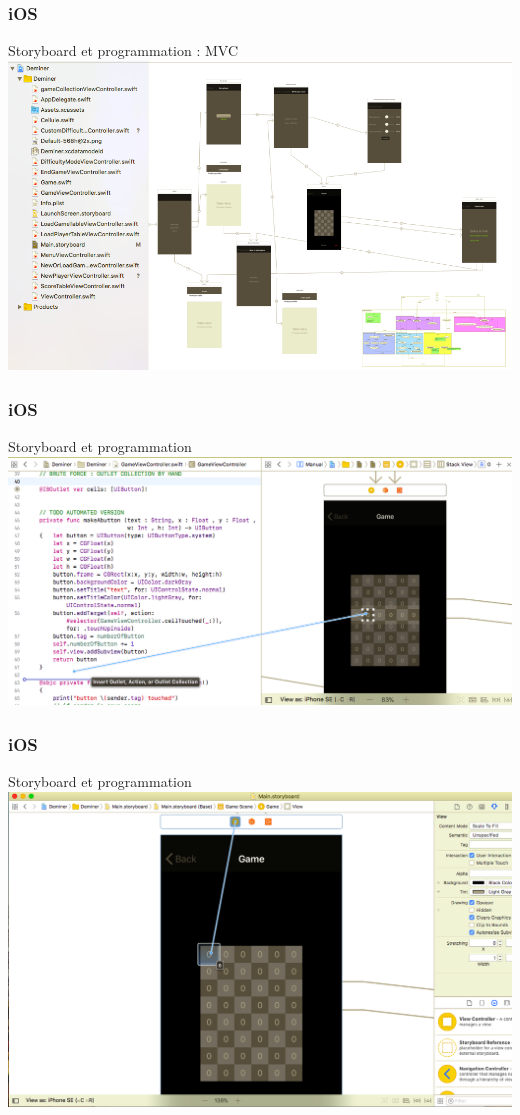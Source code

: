 \documentclass{beamer}
\begin{document}
\begin{frame}
\frametitle{iOS}
	\begin{block}{Storyboard et programmation  : MVC}
 		\includegraphics[scale=0.3]{Images/MVC.png}
	\end{block}
\end{frame}

\begin{frame}
\frametitle{iOS}
\begin{block}{Storyboard et programmation }
 		\includegraphics[scale=0.30]{Images/controlDrag.png}
	\end{block}

\end{frame}


\begin{frame}
	\frametitle{iOS}
	\begin{block}{Storyboard et programmation}
 		\includegraphics[scale=0.2]{Images/controlDragCollection.png}
	\end{block}
\end{frame}
\end{document}
